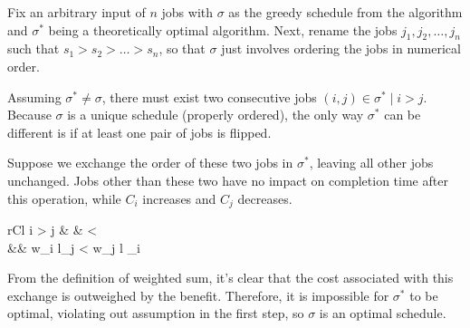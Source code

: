 \documentclass[11pt]{article}
\begin{document}
	Fix an arbitrary input of $n$ jobs with $\sigma$ as the greedy schedule from the algorithm and $\sigma^*$ being a theoretically optimal algorithm. Next, rename the jobs $j_1, j_2, \ldots , j_n$ such that $s_1 > s_2 > \ldots > s_n$, so that $\sigma$ just involves ordering the jobs in numerical order.
	
	Assuming $\sigma^* \neq \sigma$, there must exist two consecutive jobs $(i, j) \in \sigma^* \mid i > j$. Because $\sigma$ is a unique schedule (properly ordered), the only way $\sigma^*$ can be different is if at least one pair of jobs is flipped.
	
	Suppose we exchange the order of these two jobs in $\sigma^*$, leaving all other jobs unchanged. Jobs other than these two have no impact on completion time after this operation, while $C_i$ increases and $C_j$ decreases.
	
	\begin{IEEEeqnarray}{rCl}
		i > j & \rightarrow &  < \\
		&& w_i l_j < w_j l _i
	\end{IEEEeqnarray}
	
	From the definition of weighted sum, it's clear that the cost associated with this exchange is outweighed by the benefit. Therefore, it is impossible for $\sigma^*$ to be optimal, violating out assumption in the first step, so $\sigma$ is an optimal schedule.
%		
%		


\end{document}
